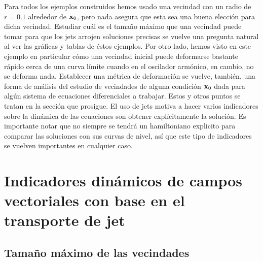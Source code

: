 Para todos los ejemplos construidos hemos usado una vecindad con un radio de $r = 0.1$ alrededor de $\mathbf{x}_0$, pero nada asegura que esta sea una buena elección para dicha vecindad. Estudiar cuál es el tamaño máximo que una vecindad puede tomar para que los jets arrojen soluciones precisas se vuelve una pregunta natural al ver las gráficas y tablas de éstos ejemplos. Por otro lado, hemos visto en este ejemplo en particular cómo una vecindad inicial puede deformarse bastante rápido cerca de una curva límite cuando en el oscilador armónico, en cambio, no se deforma nada. Establecer una métrica de deformación se vuelve, también, una forma de análisis del estudio de vecindades de alguna condición $\mathbf{x}_0$ dada para algún sistema de ecuaciones diferenciales a trabajar. Estos y otros puntos se tratan en la sección que prosigue. El uso de jets motiva a hacer varios indicadores sobre la dinámica de las ecuaciones son obtener explícitamente la solución. Es importante notar que no siempre se tendrá un hamiltoniano explicito para comparar las soluciones con sus curvas de nivel, así que este tipo de indicadores se vuelven importantes en cualquier caso.

\section{Indicadores dinámicos de campos vectoriales con base en el transporte de jet}
\label{sec:ind-dinam}


\subsection{Tamaño máximo de las vecindades}